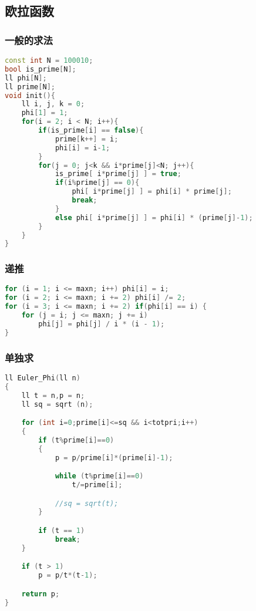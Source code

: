 \subsection{欧拉函数}
	\subsubsection{一般的求法}
		\begin{lstlisting}[language=c++]
const int N = 100010;
bool is_prime[N];
ll phi[N];
ll prime[N];
void init(){
	ll i, j, k = 0;
	phi[1] = 1;
	for(i = 2; i < N; i++){
		if(is_prime[i] == false){
			prime[k++] = i;
			phi[i] = i-1;
		}
		for(j = 0; j<k && i*prime[j]<N; j++){
			is_prime[ i*prime[j] ] = true;
			if(i%prime[j] == 0){
				phi[ i*prime[j] ] = phi[i] * prime[j];
				break;
			}
			else phi[ i*prime[j] ] = phi[i] * (prime[j]-1);
		}
	}
}
		\end{lstlisting}
	\subsubsection{递推}
		\begin{lstlisting}[language=c++]
for (i = 1; i <= maxn; i++) phi[i] = i; 
for (i = 2; i <= maxn; i += 2) phi[i] /= 2; 
for (i = 3; i <= maxn; i += 2) if(phi[i] == i) { 
    for (j = i; j <= maxn; j += i) 
        phi[j] = phi[j] / i * (i - 1); 
}
		\end{lstlisting}
	\subsubsection{单独求}
		\begin{lstlisting}[language=c++]
ll Euler_Phi(ll n)
{
	ll t = n,p = n;
	ll sq = sqrt (n);

	for (int i=0;prime[i]<=sq && i<totpri;i++)
	{
		if (t%prime[i]==0)
		{
			p = p/prime[i]*(prime[i]-1);

			while (t%prime[i]==0)
				t/=prime[i];

			//sq = sqrt(t);
		}

		if (t == 1)
			break;
	}

	if (t > 1)
		p = p/t*(t-1);

	return p;
}
		\end{lstlisting}
	